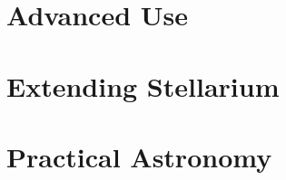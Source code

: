 \documentclass[12pt,fleqn]{book} %
\begin{document}



\part{Advanced Use}







\part{Extending Stellarium}





\part{Practical Astronomy}




\end{document}
